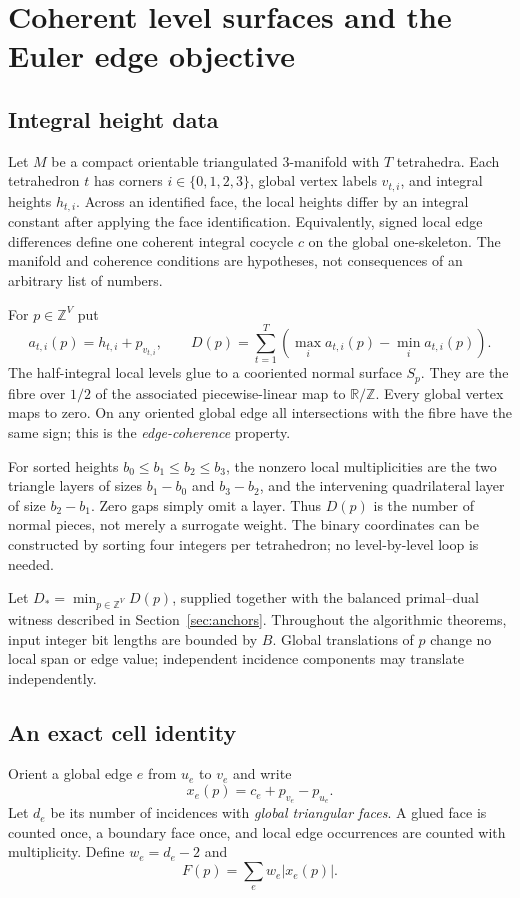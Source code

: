 \documentclass[11pt,letterpaper]{article}
\theoremstyle{definition}
\newcommand{\Z}{\mathbb Z}
\newcommand{\R}{\mathbb R}
\begin{document}
\section{Coherent level surfaces and the Euler edge objective}\label{sec:geometry}

\subsection{Integral height data}
Let $M$ be a compact orientable triangulated $3$-manifold with $T$ tetrahedra. Each tetrahedron $t$ has corners $i\in\{0,1,2,3\}$, global vertex labels $v_{t,i}$, and integral heights $h_{t,i}$. Across an identified face, the local heights differ by an integral constant after applying the face identification. Equivalently, signed local edge differences define one coherent integral cocycle $c$ on the global one-skeleton. The manifold and coherence conditions are hypotheses, not consequences of an arbitrary list of numbers.

For $p\in\Z^V$ put
\[
 a_{t,i}(p)=h_{t,i}+p_{v_{t,i}},\qquad
 D(p)=\sum_{t=1}^T\left(\max_i a_{t,i}(p)-\min_i a_{t,i}(p)\right).
\]
The half-integral local levels glue to a cooriented normal surface $S_p$. They are the fibre over $1/2$ of the associated piecewise-linear map to $\R/\Z$. Every global vertex maps to zero. On any oriented global edge all intersections with the fibre have the same sign; this is the \emph{edge-coherence} property.

For sorted heights $b_0\leq b_1\leq b_2\leq b_3$, the nonzero local multiplicities are the two triangle layers of sizes $b_1-b_0$ and $b_3-b_2$, and the intervening quadrilateral layer of size $b_2-b_1$. Zero gaps simply omit a layer. Thus $D(p)$ is the number of normal pieces, not merely a surrogate weight. The binary coordinates can be constructed by sorting four integers per tetrahedron; no level-by-level loop is needed.

Let $D_*=\min_{p\in\Z^V}D(p)$, supplied together with the balanced primal--dual witness described in Section~\ref{sec:anchors}. Throughout the algorithmic theorems, input integer bit lengths are bounded by $B$. Global translations of $p$ change no local span or edge value; independent incidence components may translate independently.

\subsection{An exact cell identity}
Orient a global edge $e$ from $u_e$ to $v_e$ and write
\[
 x_e(p)=c_e+p_{v_e}-p_{u_e}.
\]
Let $d_e$ be its number of incidences with \emph{global triangular faces}. A glued face is counted once, a boundary face once, and local edge occurrences are counted with multiplicity. Define $w_e=d_e-2$ and
\[
 F(p)=\sum_e w_e|x_e(p)|.
\]
\end{document}
